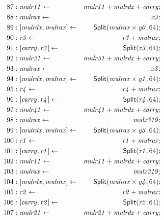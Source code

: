 {\begin{multicols}{2}
\begin{align*}
87 &: \mathit{mulr11} \leftarrow & \mathit{mulr11} + \mathit{mulrdx} + \mathit{carry}; \\
88 &: \mathit{mulrax} \leftarrow & \mathit{x3}; \\
89 &: \concat{\mathit{mulrdx}}{\mathit{mulrax}} \leftarrow & \dslcode{Split}(\mathit{mulrax} \times \mathit{y0}, 64); \\
90 &: \mathit{r3} \leftarrow & \mathit{r3} + \mathit{mulrax}; \\
91 &: \concat{\mathit{carry}}{\mathit{r3}} \leftarrow & \dslcode{Split}(\mathit{r3}, 64); \\
92 &: \mathit{mulr31} \leftarrow & \mathit{mulr31} + \mathit{mulrdx} + \mathit{carry}; \\
93 &: \mathit{mulrax} \leftarrow & \mathit{x3}; \\
94 &: \concat{\mathit{mulrdx}}{\mathit{mulrax}} \leftarrow & \dslcode{Split}(\mathit{mulrax} \times \mathit{y1}, 64); \\
95 &: \mathit{r4} \leftarrow & \mathit{r4} + \mathit{mulrax}; \\
96 &: \concat{\mathit{carry}}{\mathit{r4}} \leftarrow & \dslcode{Split}(\mathit{r4}, 64); \\
97 &: \mathit{mulr41} \leftarrow & \mathit{mulr41} + \mathit{mulrdx} + \mathit{carry}; \\
98 &: \mathit{mulrax} \leftarrow & \mathit{mulx319}; \\
99 &: \concat{\mathit{mulrdx}}{\mathit{mulrax}} \leftarrow & \dslcode{Split}(\mathit{mulrax} \times \mathit{y3}, 64); \\
100 &: \mathit{r1} \leftarrow & \mathit{r1} + \mathit{mulrax}; \\
101 &: \concat{\mathit{carry}}{\mathit{r1}} \leftarrow & \dslcode{Split}(\mathit{r1}, 64); \\
102 &: \mathit{mulr11} \leftarrow & \mathit{mulr11} + \mathit{mulrdx} + \mathit{carry}; \\
103 &: \mathit{mulrax} \leftarrow & \mathit{mulx319}; \\
104 &: \concat{\mathit{mulrdx}}{\mathit{mulrax}} \leftarrow & \dslcode{Split}(\mathit{mulrax} \times \mathit{y4}, 64); \\
105 &: \mathit{r2} \leftarrow & \mathit{r2} + \mathit{mulrax}; \\
106 &: \concat{\mathit{carry}}{\mathit{r2}} \leftarrow & \dslcode{Split}(\mathit{r2}, 64); \\
107 &: \mathit{mulr21} \leftarrow & \mathit{mulr21} + \mathit{mulrdx} + \mathit{carry}; \\

\end{align*}
\end{multicols}}
